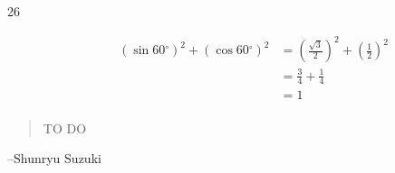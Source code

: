 \documentclass{exam}
\newcommand{\degree}{\ensuremath{^\circ}}
\begin{document}
\begin{description}
      \item[26]
        \begin{align*}
          ( \sin 60 \degree )^2 + ( \cos 60 \degree )^2 & = ( \frac{\sqrt{3}}{2} )^2 + ( \frac{1}{2} )^2 \\
                                                        & = \frac{3}{4} + \frac{1}{4} \\
                                                        & = \boxed{ 1 } \\
        \end{align*}

    \end{description}

  \else
    \vspace{1 cm}
    \begin{quote}
      \begin{em}
        TO DO
      \end{em}
    \end{quote}
    \hspace{1 cm} --Shunryu Suzuki
  \fi
\end{document}
